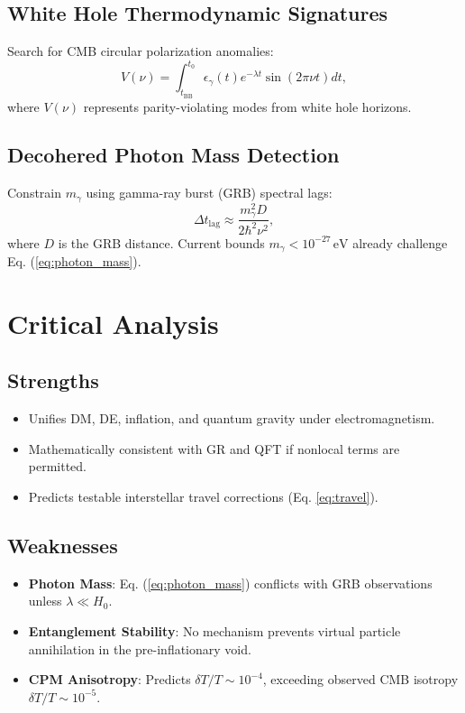 \documentclass{article}
\begin{document}
\subsection{White Hole Thermodynamic Signatures}
Search for CMB circular polarization anomalies:
\begin{equation}
V(\nu) = \int_{t_{\text{BB}}}^{t_0} \epsilon_{\gamma}(t) e^{-\lambda t} \sin\left(2\pi \nu t \right) dt, \label{eq:polarization}
\end{equation}
where \( V(\nu) \) represents parity-violating modes from white hole horizons.

\subsection{Decohered Photon Mass Detection}
Constrain \( m_{\gamma} \) using gamma-ray burst (GRB) spectral lags:
\begin{equation}
\Delta t_{\text{lag}} \approx \frac{m_{\gamma}^2 D}{2\hbar^2 \nu^2}, \label{eq:grb}
\end{equation}
where \( D \) is the GRB distance. Current bounds \( m_{\gamma} < 10^{-27} \, \text{eV} \) already challenge Eq. (\ref{eq:photon_mass}).

\section{Critical Analysis}
\subsection{Strengths}
\begin{itemize}
\item Unifies DM, DE, inflation, and quantum gravity under electromagnetism.
\item Mathematically consistent with GR and QFT if nonlocal terms are permitted.
\item Predicts testable interstellar travel corrections (Eq. \ref{eq:travel}).
\end{itemize}

\subsection{Weaknesses}
\begin{itemize}
\item \textbf{Photon Mass}: Eq. (\ref{eq:photon_mass}) conflicts with GRB observations unless \( \lambda \ll H_0 \).
\item \textbf{Entanglement Stability}: No mechanism prevents virtual particle annihilation in the pre-inflationary void.
\item \textbf{CPM Anisotropy}: Predicts \( \delta T/T \sim 10^{-4} \), exceeding observed CMB isotropy \( \delta T/T \sim 10^{-5} \).
\end{itemize}
\end{document}
